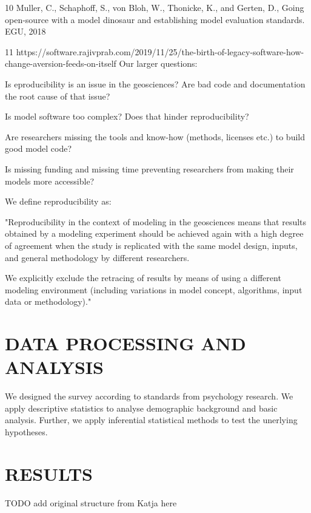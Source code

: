 \documentclass{article}
\begin{document}
10 Muller, C., Schaphoff, S., von Bloh, W., Thonicke, K., and Gerten, D., Going open-source with a model dinosaur and establishing model evaluation standards. EGU, 2018

11 https://software.rajivprab.com/2019/11/25/the-birth-of-legacy-software-how-change-aversion-feeds-on-itself
Our larger questions:

    Is eproducibility is an issue in the geosciences? Are bad code and documentation the root cause of that issue?

    Is model software too complex? Does that hinder reproducibility?

    Are researchers missing the tools and know-how (methods, licenses etc.) to build good model code?

    Is missing funding and missing time preventing researchers from making their models more accessible?

We define reproducibility as:

"Reproducibility in the context of modeling in the geosciences means that results obtained by a modeling experiment should be achieved again with a high degree of agreement when the study is replicated with the same model design, inputs, and general methodology by different researchers.

We explicitly exclude the retracing of results by means of using a different modeling environment (including variations in model concept, algorithms, input data or methodology)."

\section{DATA PROCESSING AND ANALYSIS}

We designed the survey according to standards from psychology research. We apply descriptive statistics to analyse demographic background and basic analysis.
Further, we apply inferential statistical methods to test the unerlying hypotheses.

\section{RESULTS}
TODO add original structure from Katja here
\end{document}
